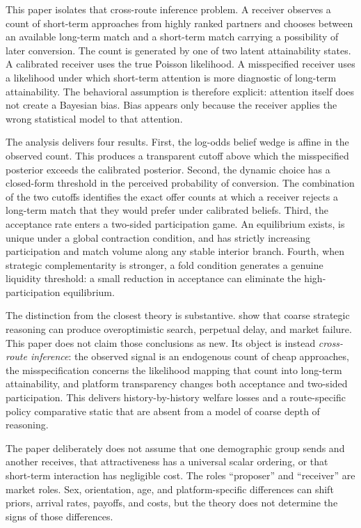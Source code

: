 \documentclass[11pt]{article}
\begin{document}
This paper isolates that cross-route inference problem. A receiver observes a
count of short-term approaches from highly ranked partners and chooses between
an available long-term match and a short-term match carrying a possibility of
later conversion. The count is generated by one of two latent attainability
states. A calibrated receiver uses the true Poisson likelihood. A misspecified
receiver uses a likelihood under which short-term attention is more diagnostic
of long-term attainability. The behavioral assumption is therefore explicit:
attention itself does not create a Bayesian bias. Bias appears only because the
receiver applies the wrong statistical model to that attention.

The analysis delivers four results. First, the log-odds belief wedge is affine
in the observed count. This produces a transparent cutoff above which the
misspecified posterior exceeds the calibrated posterior. Second, the dynamic
choice has a closed-form threshold in the perceived probability of conversion.
The combination of the two cutoffs identifies the exact offer counts at which a
receiver rejects a long-term match that they would prefer under calibrated
beliefs. Third, the acceptance rate enters a two-sided participation game. An
equilibrium exists, is unique under a global contraction condition, and has
strictly increasing participation and match volume along any stable interior
branch. Fourth, when strategic complementarity is stronger, a fold condition
generates a genuine liquidity threshold: a small reduction in acceptance can
eliminate the high-participation equilibrium.

The distinction from the closest theory is substantive. \citet{antler2022}
show that coarse strategic reasoning can produce overoptimistic search,
perpetual delay, and market failure. This paper does not claim those conclusions
as new. Its object is instead \emph{cross-route inference}: the observed signal
is an endogenous count of cheap approaches, the misspecification concerns the
likelihood mapping that count into long-term attainability, and platform
transparency changes both acceptance and two-sided participation. This delivers
history-by-history welfare losses and a route-specific policy comparative
static that are absent from a model of coarse depth of reasoning.

The paper deliberately does not assume that one demographic group sends and
another receives, that attractiveness has a universal scalar ordering, or that
short-term interaction has negligible cost. The roles ``proposer'' and
``receiver'' are market roles. Sex, orientation, age, and platform-specific
differences can shift priors, arrival rates, payoffs, and costs, but the theory
does not determine the signs of those differences.
\end{document}

